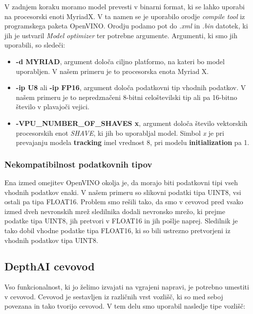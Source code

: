 \documentclass[a4paper,12pt,openright]{book}
\begin{document}
V zadnjem koraku moramo model prevesti v binarni format, ki se lahko uporabi na procesorski enoti MyriadX. V ta namen se je uporabilo orodje \emph{compile tool} iz programskega paketa OpenVINO. Orodju podamo pot do \emph{.xml} in \emph{.bin} datotek, ki jih je ustvaril \emph{Model optimizer} ter potrebne argumente. Argumenti, ki smo jih uporabili, so sledeči:

\begin{itemize}
    \item \textbf{-d MYRIAD}, argument določa ciljno platformo, na kateri bo model uporabljen. V našem primeru je to procesorska enota Myriad X.
    \item \textbf{-ip U8} ali \textbf{-ip FP16}, argument določa podatkovni tip vhodnih podatkov. V našem primeru je to nepredznačeni 8-bitni celoštevilski tip ali pa 16-bitno število v plavajoči vejici.
    \item \textbf{-VPU\_NUMBER\_OF\_SHAVES x}, argument določa število vektorskih procesorskih enot \emph{SHAVE}, ki jih bo uporabljal model. Simbol \emph{x} je pri prevajanju modela \textbf{tracking} imel vrednost 8, pri modelu \textbf{initialization} pa 1.
\end{itemize}

\subsubsection{Nekompatibilnost podatkovnih tipov}
\label{section:nekompatibilnost}
Ena izmed omejitev OpenVINO okolja je, da morajo biti podatkovni tipi vseh vhodnih podatkov enaki. V našem primeru so slikovni podatki tipa UINT8, vsi ostali pa tipa FLOAT16. Problem smo rešili tako, da smo v cevovod pred vsako izmed dveh nevronskih mrež sledilnika dodali nevronsko mrežo, ki prejme podatke tipa UINT8, jih pretvori v FLOAT16 in jih pošlje naprej. Sledilnik je tako dobil vhodne podatke tipa FLOAT16, ki so bili ustrezno pretvorjeni iz vhodnih podatkov tipa UINT8.



\subsection{DepthAI cevovod}
\label{sec:pipeline}
Vso funkcionalnost, ki jo želimo izvajati na vgrajeni napravi, je potrebno umestiti v cevovod. Cevovod je sestavljen iz različnih vrst vozlišč, ki so med seboj povezana in tako tvorijo cevovod. V tem delu smo uporabil nasledje tipe vozlišč:
\end{document}
